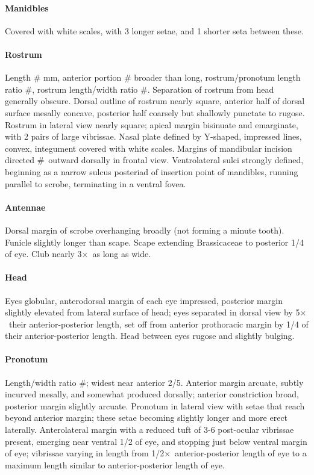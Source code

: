 \documentclass[fleqn,10pt,lineno]{wlpeerj} %
\newcommand{\td}{\textdegree~}
\newcommand{\x}{$\times$~}
\begin{document}
			\paragraph{Manidbles}
				Covered with white scales, with 3 longer setae, and 1 shorter seta between these.
			\paragraph{Rostrum}
				Length \# mm, anterior portion \# broader than long, rostrum/pronotum length ratio \#, rostrum length/width ratio \#.
				Separation of rostrum from head generally obscure. 
				Dorsal outline of rostrum nearly square, anterior half of dorsal surface mesally concave, posterior half coarsely but shallowly punctate to rugose. 
				Rostrum in lateral view nearly square; apical margin bisinuate and emarginate, with 2 pairs of large vibrissae. 
				Nasal plate defined by Y-shaped, impressed lines, convex, integument covered with white scales.
				Margins of mandibular incision directed \#\td outward dorsally in frontal view. 
				Ventrolateral sulci strongly defined, beginning as a narrow sulcus posteriad of insertion point of mandibles, running parallel to scrobe, terminating in a ventral fovea.
			\paragraph{Antennae}
				Dorsal margin of scrobe overhanging broadly (not forming a minute tooth).
				Funicle slightly longer than scape.
				Scape extending Brassicaceae  to posterior 1/4 of eye.
				Club nearly 3\x as long as wide.
			\paragraph{Head}
				Eyes globular, anterodorsal margin of each eye impressed, posterior margin slightly elevated from lateral surface of head; eyes separated in dorsal view by 5\x their anterior-posterior length, set off from anterior prothoracic margin by 1/4 of their anterior-posterior length.
				Head between eyes rugose and slightly bulging.
			\paragraph{Pronotum}
				Length/width ratio \#; widest near anterior 2/5.
				Anterior margin arcuate, subtly incurved mesally, and somewhat produced dorsally; anterior constriction broad, posterior margin slightly arcuate.
				Pronotum in lateral view with setae that reach beyond anterior margin; these setae becoming slightly longer and more erect laterally.
				Anterolateral margin with a reduced tuft of 3-6 post-ocular vibrissae present, emerging near ventral 1/2 of eye, and stopping just below ventral margin of eye; vibrissae varying in length from 1/2\x anterior-posterior length of eye to a maximum length similar to anterior-posterior length of eye.
\end{document}
